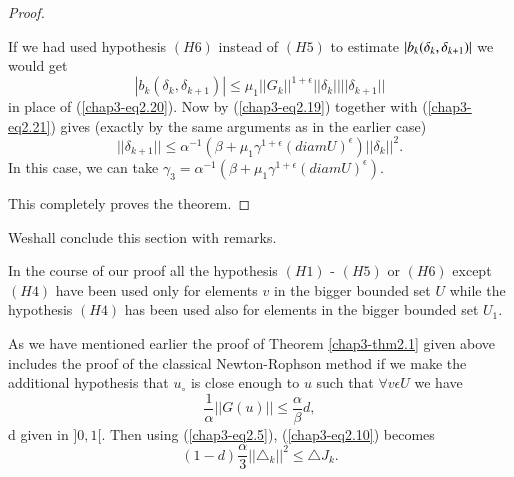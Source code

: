 \begin{proof}
\begin{step}
If we had used hypothesis $(H6)$ instead of $(H5)$ to estimate $|b_{k} (\delta_{k},\break \delta_{k+1})|$ we would get
\begin{equation*}
|b_{k} (\delta_{k}, \delta_{k+1})| \leq \mu_{1} ||G_{k}||^{1+\epsilon} ||\delta_{k}|| ||\delta_{k+1}||\tag*{$(2.20)'$}\label{chap3-eq2.20'}
\end{equation*}
in place of (\ref{chap3-eq2.20}). Now by (\ref{chap3-eq2.19}) together with (\ref{chap3-eq2.21}) gives (exactly by the same arguments as in the earlier case)
$$
||\delta_{k+1}|| \leq \alpha^{-1} (\beta + \mu_{1} \gamma^{1+\epsilon} (diam U)^{\epsilon}) ||\delta_{k}||^{2}.
$$
In this case, we can take $\gamma_{3} = \alpha^{-1} (\beta + \mu_{1} \gamma^{1+\epsilon} (diam U)^{\epsilon}).$
\end{step}

This completely proves the theorem.
\end{proof}

We\pageoriginale shall conclude this section with remarks.

\begin{remark}\label{chap3-rem2.1}
In the course of our proof all the hypothesis $(H1)$ - $(H5)$ or $(H6)$ except $(H4)$ have been used only for elements $v$ in the bigger bounded set $U$ while the hypothesis $(H4)$ has been used also for elements in the bigger bounded set $U_{1}$.
\end{remark}

\begin{remark}\label{chap3-rem2.2}
As we have mentioned earlier the proof of Theorem \ref{chap3-thm2.1} given above includes the proof of the classical Newton-Rophson method if we make the additional hypothesis that $u_{\circ}$ is close enough to $u$ such that $\forall v \epsilon U$ we have
$$
\dfrac{1}{\alpha} ||G(u)|| \leq \dfrac{\alpha}{\beta} d,
$$
d given in $]0, 1[$. Then using (\ref{chap3-eq2.5}), (\ref{chap3-eq2.10}) becomes
$$
(1-d) \dfrac{\alpha}{3} ||\triangle_{k}||^{2} \leq \triangle J_{k}.
$$
\end{remark}

